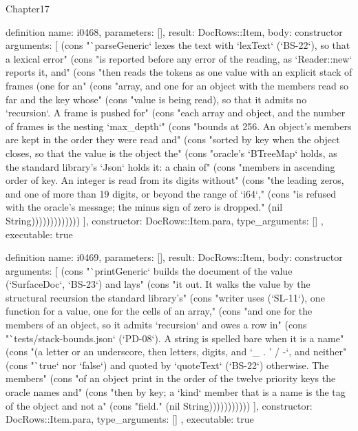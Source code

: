 \begin{lexlean}{Chapter17}
\begin{semanticmodule}
definition{
  name: i0468,
  parameters: [],
  result: DocRows::Item,
  body: constructor{
    arguments: [
      (cons "`parseGeneric` lexes the text with `lexText` (`BS-22`), so that a lexical error" (cons "is reported before any error of the reading, as `Reader::new` reports it, and" (cons "then reads the tokens as one value with an explicit stack of frames (one for an" (cons "array, and one for an object with the members read so far and the key whose" (cons "value is being read), so that it admits no `recursion`. A frame is pushed for" (cons "each array and object, and the number of frames is the nesting `max_depth`" (cons "bounds at 256. An object's members are kept in the order they were read and" (cons "sorted by key when the object closes, so that the value is the object the" (cons "oracle's `BTreeMap` holds, as the standard library's `Json` holds it: a chain of" (cons "members in ascending order of key. An integer is read from its digits without" (cons "the leading zeros, and one of more than 19 digits, or beyond the range of `i64`," (cons "is refused with the oracle's message; the minus sign of zero is dropped." (nil String)))))))))))))
    ],
    constructor: DocRows::Item.para,
    type_arguments: []
  },
  executable: true
}

definition{
  name: i0469,
  parameters: [],
  result: DocRows::Item,
  body: constructor{
    arguments: [
      (cons "`printGeneric` builds the document of the value (`SurfaceDoc`, `BS-23`) and lays" (cons "it out. It walks the value by the structural recursion the standard library's" (cons "writer uses (`SL-11`), one function for a value, one for the cells of an array," (cons "and one for the members of an object, so it admits `recursion` and owes a row in" (cons "`tests/stack-bounds.json` (`PD-08`). A string is spelled bare when it is a name" (cons "(a letter or an underscore, then letters, digits, and `_ . ' / -`, and neither" (cons "`true` nor `false`) and quoted by `quoteText` (`BS-22`) otherwise. The members" (cons "of an object print in the order of the twelve priority keys the oracle names and" (cons "then by key; a `kind` member that is a name is the tag of the object and not a" (cons "field." (nil String)))))))))))
    ],
    constructor: DocRows::Item.para,
    type_arguments: []
  },
  executable: true
}


\end{semanticmodule}
\end{lexlean}
